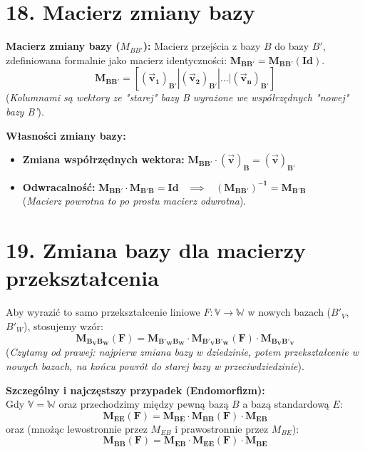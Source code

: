 \documentclass[12pt,a4paper]{article}
\begin{document}
\section*{18. Macierz zmiany bazy}
\noindent\textbf{Macierz zmiany bazy ($M_{BB'}$):} Macierz przejścia z bazy $B$ do bazy $B'$, zdefiniowana formalnie jako macierz identyczności: $\mathbf{M_{BB'} = M_{BB'}(Id)}$.
$$ \mathbf{M_{BB'} = [(\vec{v}_1)_{B'} | (\vec{v}_2)_{B'} | \dots | (\vec{v}_n)_{B'}]} $$
(\textit{Kolumnami są wektory ze "starej" bazy B wyrażone we współrzędnych "nowej" bazy B'}).

\noindent\textbf{Własności zmiany bazy:}
\begin{itemize}
    \item \textbf{Zmiana współrzędnych wektora:} $\mathbf{M_{BB'} \cdot (\vec{v})_B = (\vec{v})_{B'}}$
    \item \textbf{Odwracalność:} $\mathbf{M_{BB'} \cdot M_{B'B} = Id}$ \ $\implies$ \ $\mathbf{(M_{BB'})^{-1} = M_{B'B}}$ \\
    (\textit{Macierz powrotna to po prostu macierz odwrotna}).
\end{itemize}

\section*{19. Zmiana bazy dla macierzy przekształcenia}
Aby wyrazić to samo przekształcenie liniowe $F: \mathbb{V} \to \mathbb{W}$ w nowych bazach ($B'_V$, $B'_W$), stosujemy wzór:
$$ \mathbf{M_{B_V B_W}(F) = M_{B'_W B_W} \cdot M_{B'_V B'_W}(F) \cdot M_{B_V B'_V}} $$
(\textit{Czytamy od prawej: najpierw zmiana bazy w dziedzinie, potem przekształcenie w nowych bazach, na końcu powrót do starej bazy w przeciwdziedzinie}).

\noindent\textbf{Szczególny i najczęstszy przypadek (Endomorfizm):} \\
Gdy $\mathbb{V} = \mathbb{W}$ oraz przechodzimy między pewną bazą $B$ a bazą standardową $E$:
$$ \mathbf{M_{EE}(F) = M_{BE} \cdot M_{BB}(F) \cdot M_{EB}}$$
oraz (mnożąc lewostronnie przez $M_{EB}$ i prawostronnie przez $M_{BE}$):
$$ \mathbf{M_{BB}(F) = M_{EB} \cdot M_{EE}(F) \cdot M_{BE}}$$
\end{document}
